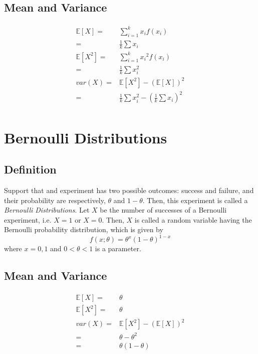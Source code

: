 \documentclass[titlepage]{article}
\begin{document}
        \subsection*{Mean and Variance}
            \paragraph{
                \begin{equation*}
                    \begin{split}
                        \mathbb{E}[X]=&\sum_{i=1}^k x_if(x_i)\\
                        =&\frac{1}{k}\sum x_i\\
                        \mathbb{E}[X^2]=&\sum_{i=1}^k {x_i}^2f(x_i)\\
                        =&\frac{1}{k}\sum x_i^2\\
                        var(X)=&\mathbb{E}[X^2]-(\mathbb{E}[X])^2\\
                        =&\frac{1}{k}\sum x_i^2-(\frac{1}{k}\sum x_i)^2\\
                    \end{split}
                \end{equation*}
            }

    \section{Bernoulli Distributions}
        \subsection*{Definition}
            Support that and experiment has two possible outcomes: success and failure, and their probability are respectively, $\theta$ and $1-\theta$. Then, this experiment is called a \textit{Bernoulli Distributions}. Let $X$ be the number of successes of a Bernoulli experiment, i.e. $X=1$ or $X=0$. Then, $X$ is called a random variable having the Bernoulli probability distribution, which is given by
            $$f(x;\theta)=\theta^x(1-\theta)^{1-x}$$
            where $x=0,1$ and $0<\theta<1$ is a parameter.

        \subsection*{Mean and Variance}
            \paragraph{
                \begin{equation*}
                    \begin{split}
                        \mathbb{E}[X]=&\theta\\
                        \mathbb{E}[X^2]=&\theta\\
                        var(X)=&\mathbb{E}[X^2]-(\mathbb{E}[X])^2\\
                        =&\theta-\theta^2\\
                        =&\theta(1-\theta)
                    \end{split}
                \end{equation*}
            }
\end{document}
